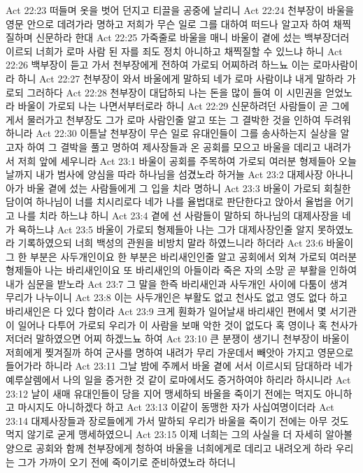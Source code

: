 Act 22:23  떠들며 옷을 벗어 던지고 티끌을 공중에 날리니
Act 22:24  천부장이 바울을 영문 안으로 데려가라 명하고 저희가 무슨 일로 그를 대하여 떠드나 알고자 하여 채찍질하며 신문하라 한대
Act 22:25  가죽줄로 바울을 매니 바울이 곁에 섰는 백부장더러 이르되 너희가 로마 사람 된 자를 죄도 정치 아니하고 채찍질할 수 있느냐 하니
Act 22:26  백부장이 듣고 가서 천부장에게 전하여 가로되 어찌하려 하느뇨 이는 로마사람이라 하니
Act 22:27  천부장이 와서 바울에게 말하되 네가 로마 사람이냐 내게 말하라 가로되 그러하다
Act 22:28  천부장이 대답하되 나는 돈을 많이 들여 이 시민권을 얻었노라 바울이 가로되 나는 나면서부터로라 하니
Act 22:29  신문하려던 사람들이 곧 그에게서 물러가고 천부장도 그가 로마 사람인줄 알고 또는 그 결박한 것을 인하여 두려워하니라
Act 22:30  이튿날 천부장이 무슨 일로 유대인들이 그를 송사하는지 실상을 알고자 하여 그 결박을 풀고 명하여 제사장들과 온 공회를 모으고 바울을 데리고 내려가서 저희 앞에 세우니라
Act 23:1  바울이 공회를 주목하여 가로되 여러분 형제들아 오늘날까지 내가 범사에 양심을 따라 하나님을 섬겼노라 하거늘
Act 23:2  대제사장 아나니아가 바울 곁에 섰는 사람들에게 그 입을 치라 명하니
Act 23:3  바울이 가로되 회칠한 담이여 하나님이 너를 치시리로다 네가 나를 율법대로 판단한다고 앉아서 율법을 어기고 나를 치라 하느냐 하니
Act 23:4  곁에 선 사람들이 말하되 하나님의 대제사장을 네가 욕하느냐
Act 23:5  바울이 가로되 형제들아 나는 그가 대제사장인줄 알지 못하였노라 기록하였으되 너희 백성의 관원을 비방치 말라 하였느니라 하더라
Act 23:6  바울이 그 한 부분은 사두개인이요 한 부분은 바리새인인줄 알고 공회에서 외쳐 가로되 여러분 형제들아 나는 바리새인이요 또 바리새인의 아들이라 죽은 자의 소망 곧 부활을 인하여 내가 심문을 받노라
Act 23:7  그 말을 한즉 바리새인과 사두개인 사이에 다툼이 생겨 무리가 나누이니
Act 23:8  이는 사두개인은 부활도 없고 천사도 없고 영도 없다 하고 바리새인은 다 있다 함이라
Act 23:9  크게 훤화가 일어날새 바리새인 편에서 몇 서기관이 일어나 다투어 가로되 우리가 이 사람을 보매 악한 것이 없도다 혹 영이나 혹 천사가 저더러 말하였으면 어찌 하겠느뇨 하여
Act 23:10  큰 분쟁이 생기니 천부장이 바울이 저희에게 찢겨질까 하여 군사를 명하여 내려가 무리 가운데서 빼앗아 가지고 영문으로 들어가라 하니라
Act 23:11  그날 밤에 주께서 바울 곁에 서서 이르시되 담대하라 네가 예루살렘에서 나의 일을 증거한 것 같이 로마에서도 증거하여야 하리라 하시니라
Act 23:12  날이 새매 유대인들이 당을 지어 맹세하되 바울을 죽이기 전에는 먹지도 아니하고 마시지도 아니하겠다 하고
Act 23:13  이같이 동맹한 자가 사십여명이더라
Act 23:14  대제사장들과 장로들에게 가서 말하되 우리가 바울을 죽이기 전에는 아무 것도 먹지 않기로 굳게 맹세하였으니
Act 23:15  이제 너희는 그의 사실을 더 자세히 알아볼 양으로 공회와 함께 천부장에게 청하여 바울을 너희에게로 데리고 내려오게 하라 우리는 그가 가까이 오기 전에 죽이기로 준비하였노라 하더니
